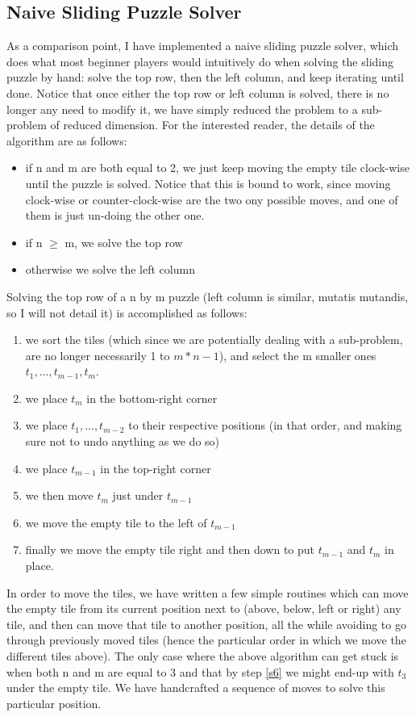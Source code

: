 \subsection{Naive Sliding Puzzle Solver}
As a comparison point, I have implemented a naive sliding puzzle solver, which does what most beginner players would intuitively do when solving the sliding puzzle by hand: solve the top row, then the left column, and keep iterating until done. Notice that once either the top row or left column is solved, there is no longer any need to modify it, we have simply reduced the problem to a sub-problem of reduced dimension. For the interested reader, the details of the algorithm are as follows:
\begin{itemize}
\item if n and m are both equal to 2, we just keep moving the empty tile clock-wise until the puzzle is solved. Notice that this is bound to work, since moving clock-wise or counter-clock-wise are the two ony possible moves, and one of them is just un-doing the other one.
\item if n $\geq$ m, we solve the top row
\item otherwise we solve the left column
\end{itemize}
Solving the top row of a n by m puzzle (left column is similar, mutatis mutandis, so I will not detail it) is accomplished as follows:
\begin{enumerate}
\item \label{s1} we sort the tiles (which since we are potentially dealing with a sub-problem, are no longer necessarily 1 to $m* n - 1$), and select the m smaller ones $t_{1}, ..., t_{m-1}, t_{m}$.
\item \label{s2} we place $t_{m}$ in the bottom-right corner
\item \label{s3} we place $t_{1}, ..., t_{m-2}$ to their respective positions (in that order, and making sure not to undo anything as we do so)
\item \label{s4} we place $t_{m-1}$ in the top-right corner
\item \label{s5} we then move $t_{m}$ just under $t_{m-1}$
\item \label{s6} we move the empty tile to the left of $t_{m-1}$
\item \label{s7} finally we move the empty tile right and then down to put $t_{m-1}$ and $t_{m}$ in place.
\end{enumerate}
In order to move the tiles, we have written a few simple routines which can move the empty tile from its current position next to (above, below, left or right) any tile, and then can move that tile to another position, all the while avoiding to go through previously moved tiles (hence the particular order in which we move the different tiles above). The only case where the above algorithm can get stuck is when both n and m are equal to 3 and that by step \ref{s6} we might end-up with $t_{3}$ under the empty tile. We have handcrafted a sequence of moves to solve this particular position.
